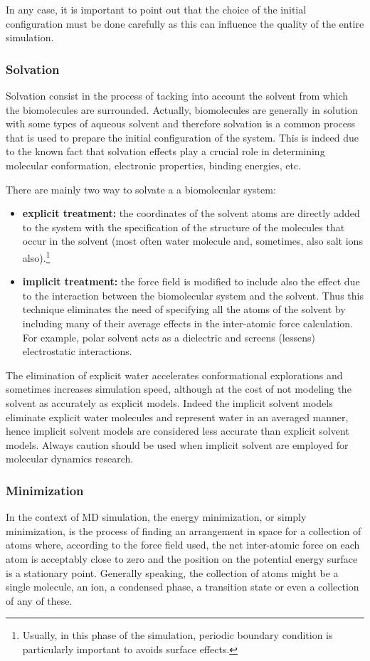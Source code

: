 In any case, it is important to point out that the choice of the initial configuration must be done carefully as this can influence the quality of the entire simulation.

\subsubsection{Solvation}
Solvation consist in the process of tacking into account the solvent from which the biomolecules are surrounded. Actually, biomolecules are generally in solution with some types of aqueous solvent and therefore solvation is a common process that is used to prepare the initial configuration of the system. This is indeed due to the known fact that solvation effects play a crucial role in determining molecular conformation, electronic properties, binding energies, etc.

There are mainly two way to solvate a a biomolecular system:
\begin{itemize}
\item \textbf{explicit treatment:} the coordinates of the solvent atoms are directly added to the system with the specification of the structure of the molecules that occur in the solvent (most often water molecule and, sometimes, also salt ions also).\footnote{Usually, in this phase of the simulation, periodic boundary condition is particularly important to avoids surface effects.} 
\item \textbf{implicit treatment:} the force field is modified to include also the effect due to the interaction between the biomolecular system and the solvent. Thus this technique eliminates the need of specifying all the atoms of the solvent by including many of their average effects in the inter-atomic force calculation. For example, polar solvent acts as a dielectric and screens (lessens) electrostatic interactions. 
\end{itemize}

The elimination of explicit water accelerates conformational explorations and sometimes increases simulation speed, although at the cost of not modeling the solvent as accurately as explicit models.
Indeed the implicit solvent models eliminate explicit water molecules and represent water in an averaged manner, hence implicit solvent models are considered less accurate than explicit solvent models. Always caution should be used when implicit solvent are employed for molecular dynamics research.

\subsubsection{Minimization}
In the context of MD simulation, the energy minimization, or simply minimization, is the process of finding an arrangement in space for a collection of atoms where, according to the force field used, the net inter-atomic force on each atom is acceptably close to zero and the position on the potential energy surface is a stationary point. Generally speaking, the collection of atoms might be a single molecule, an ion, a condensed phase, a transition state or even a collection of any of these. 

